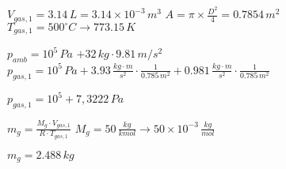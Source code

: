 \( V_{gas,1} = 3.14 \, L = 3.14 \times 10^{-3} \, m^3 \)  
\( A = \pi \times \frac{D^2}{4} = 0.7854 \, m^2 \)  
\( T_{gas,1} = 500^\circ C \rightarrow 773.15 \, K \)  

\( p_{amb} = 10^5 \, Pa \)  
\( + 32 \, kg \cdot 9.81 \, m/s^2 \)  
\( p_{gas,1} = 10^5 \, Pa + 3.93 \, \frac{kg \cdot m}{s^2} \cdot \frac{1}{0.785 \, m^2} + 0.981 \, \frac{kg \cdot m}{s^2} \cdot \frac{1}{0.785 \, m^2} \)  

\( p_{gas,1} = 10^5 + 7,3222 \, Pa \)  

\( m_g = \frac{M_g \cdot V_{gas,1}}{R \cdot T_{gas,1}} \)  
\( M_g = 50 \, \frac{kg}{kmol} \rightarrow 50 \times 10^{-3} \, \frac{kg}{mol} \)  

\( m_g = 2.488 \, kg \)